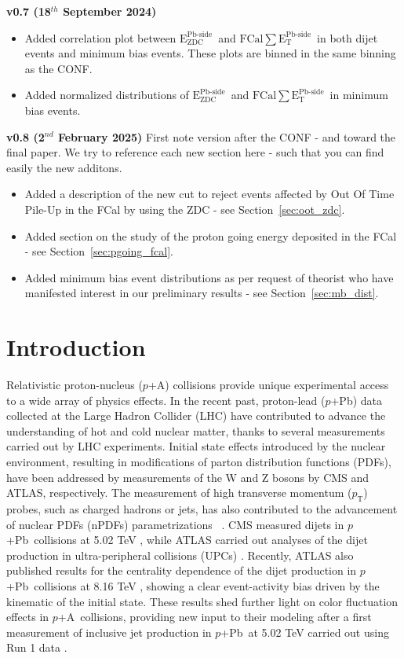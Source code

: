 \documentclass[NOTE, atlasdraft=true, texlive=2020, UKenglish]{atlasdoc}
\newcommand{\EZDC}{$\text{E}_\text{ZDC}^\text{Pb-side}$}
\newcommand{\ETPB}{$\text{FCal} \sum \text{E}_{\text{T}}^{\text{Pb-side} }$}
\newcommand{\PT}{$p_{\text{T}}$}
\newcommand{\pxA}{$p$+A}
\newcommand{\pxPb}{$p$+Pb}
\begin{document}
\textbf{v0.7 (18$^{th}$ September 2024)}
\begin{itemize}
    \item Added correlation plot between \EZDC\ and \ETPB\ in both dijet events and minimum bias events.  These plots are binned in the same binning as the CONF. 
    \item Added normalized distributions of \EZDC\ and \ETPB\ in minimum bias events.
\end{itemize}
\textbf{v0.8 (2$^{nd}$ February 2025)}
First note version after the CONF - and toward the final paper. We try to reference each new section here - such that you can find easily the new additons. 
\begin{itemize}
    \item Added a description of the new cut to reject events affected by Out Of Time Pile-Up in the FCal by using the ZDC - see Section~\ref{sec:oot_zdc}.  
    \item Added section on the study of the proton going energy deposited in the FCal - see Section~\ref{sec:pgoing_fcal}.
    \item Added minimum bias event distributions as per request of theorist who have manifested interest in our preliminary results - see Section~\ref{sec:mb_dist}.
\end{itemize}



%
\clearpage{}
\clearpage{}\section{Introduction}
\label{sec:intro}
Relativistic proton-nucleus (\pxA) collisions provide unique experimental access to a wide array of physics effects. In the recent past, proton-lead (\pxPb) data collected at the Large Hadron Collider (LHC) have contributed to advance the understanding of hot and cold nuclear matter, thanks to several measurements carried out by LHC experiments. 
Initial state effects introduced by the nuclear environment, resulting in modifications of parton distribution functions (PDFs), have been addressed by measurements of the W \cite{CMS_W_2015565} and Z \cite{ATLAS:2015mwq} bosons by CMS and ATLAS, respectively. The measurement of high transverse momentum (\PT{}) probes, such as charged hadrons or jets, has also contributed to the advancement of nuclear PDFs (nPDFs) parametrizations ~\cite{Rabah::nPDF2021,Eskola2019,Eskola2020,PAUKKUNEN2017241, Helenius:2022rmf}. CMS measured dijets in \pxPb\ collisions at 5.02 TeV \cite{CMS-HIN-13-001}, while ATLAS carried out analyses of the dijet production in ultra-peripheral collisions (UPCs) \cite{ATLAS:2022cbd}. 
Recently, ATLAS also published results for the centrality dependence of the dijet production in \pxPb\ collisions at 8.16 TeV \cite{ATLAS:2023zfx}, showing a clear event-activity bias driven by the kinematic of the initial state. These results shed further light on color fluctuation effects \cite{Mueller:1982, Brodsky:1982, PhysRevLett.47.297} in \pxA\ collisions, providing new input to their modeling after a first measurement of inclusive jet production in \pxPb\ at 5.02 TeV carried out using Run 1 data \cite{ATLAS:2014cpa}. 
\end{document}
